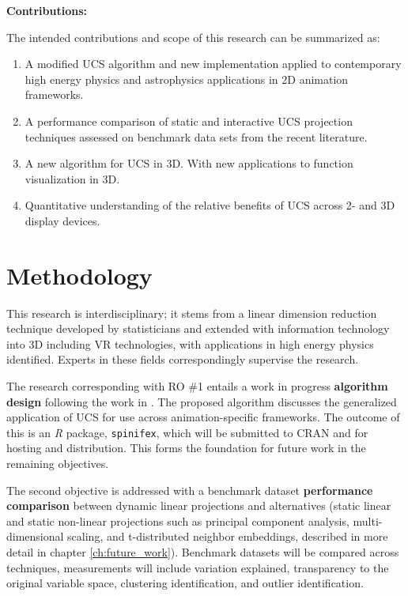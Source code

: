 \documentclass{monashthesis}
\begin{document}
\textbf{Contributions:}

The intended contributions and scope of this research can be summarized
as:

\begin{enumerate}
\def\labelenumi{\arabic{enumi}.}
\tightlist
\item
  A modified UCS algorithm and new implementation applied to
  contemporary high energy physics and astrophysics applications in 2D
  animation frameworks.
\item
  A performance comparison of static and interactive UCS projection
  techniques assessed on benchmark data sets from the recent literature.
\item
  A new algorithm for UCS in 3D. With new applications to function
  visualization in 3D.
\item
  Quantitative understanding of the relative benefits of UCS across 2-
  and 3D display devices.
\end{enumerate}

\section{Methodology}\label{methodology}

This research is interdisciplinary; it stems from a linear dimension
reduction technique developed by statisticians and extended with
information technology into 3D including VR technologies, with
applications in high energy physics
identified\autocite{cook_dynamical_2018}. Experts in these fields
correspondingly supervise the research.

The research corresponding with RO \#1 entails a work in progress
\textbf{algorithm design} following the work in
\textcite{cook_manual_1997}. The proposed algorithm discusses the
generalized application of UCS for use across animation-specific
frameworks. The outcome of this is an \emph{R} package,
\texttt{spinifex}, which will be submitted to CRAN and for hosting and
distribution. This forms the foundation for future work in the remaining
objectives.

The second objective is addressed with a benchmark dataset
\textbf{performance comparison} between dynamic linear projections and
alternatives (static linear and static non-linear projections such as
principal component analysis, multi-dimensional scaling, and
t-distributed neighbor embeddings, described in more detail in chapter
\ref{ch:future_work}). Benchmark datasets will be compared across
techniques, measurements will include variation explained, transparency
to the original variable space, clustering identification, and outlier
identification.
\end{document}
